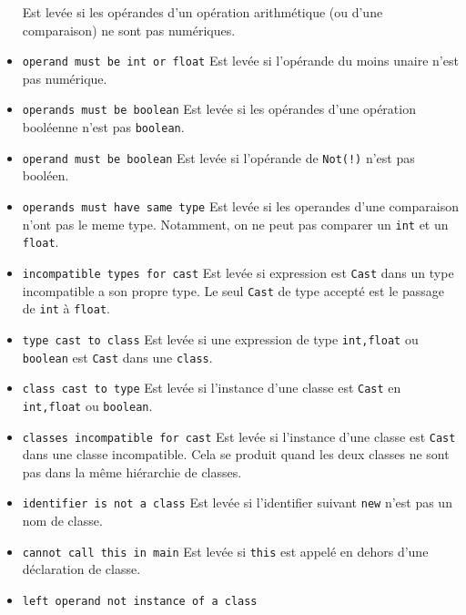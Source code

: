 \documentclass[a4paper]{article}
\begin{document}
\begin{itemize}
\newline
Est levée si les opérandes d'un opération arithmétique (ou d'une comparaison) ne sont pas numériques.
\item \texttt{operand must be int or float}
\newline
Est levée si l'opérande du moins unaire n'est pas numérique.
\item \texttt{operands must be boolean}
\newline
Est levée si les opérandes d'une opération booléenne n'est pas \texttt{boolean}.
\item \texttt{operand must be boolean}
\newline
Est levée si l'opérande de \texttt{Not(!)} n'est pas booléen.
\item \texttt{operands must have same type}
\newline
Est levée si les operandes d'une comparaison n'ont pas le meme type. Notamment, on ne peut pas comparer un \texttt{int} et un \texttt{float}.
\item \texttt{incompatible types for cast}
\newline
Est levée si expression est \texttt{Cast} dans un type incompatible a son propre type. Le seul \texttt{Cast} de type accepté est le passage de \texttt{int} \`a \texttt{float}.
\item \texttt{type cast to class}
\newline
Est levée si une expression de type \texttt{int,float} ou \texttt{boolean} est \texttt{Cast} dans une \texttt{class}.
\item \texttt{class cast to type}
\newline
Est levée si l'instance d'une classe est \texttt{Cast} en \texttt{int,float} ou \texttt{boolean}.
\item \texttt{classes incompatible for cast}
\newline
Est levée si l'instance d'une classe est \texttt{Cast} dans une classe incompatible. Cela se produit quand les deux classes ne sont pas dans la même hiérarchie de classes.
\item \texttt{identifier is not a class}
\newline
Est levée si l'identifier suivant \texttt{new} n'est pas un nom de classe.
\item \texttt{cannot call this in main}
\newline
Est levée si \texttt{this} est appelé en dehors d'une déclaration de classe.
\item \texttt{left operand not instance of a class}
\newline

\end{itemize}
\end{document}
